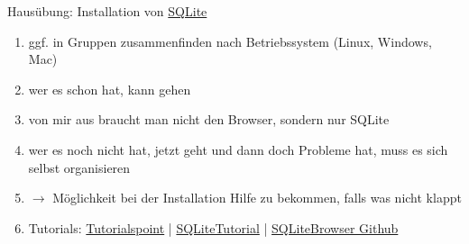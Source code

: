 \begin{frame}[standout]
    \alert{Hausübung:} Installation von \alert{\href{https://sqlitebrowser.org/dl/}{SQLite}} \\[1em]
    {\footnotesize
    \begin{enumerate}
        \item ggf. in Gruppen zusammenfinden nach Betriebssystem (Linux, Windows, Mac)
        \item wer es schon hat, kann gehen
        \item von mir aus braucht man nicht den Browser, sondern nur SQLite 
        \item wer es noch nicht hat, jetzt geht und dann doch Probleme hat, muss es sich selbst organisieren
        \item $\to$ Möglichkeit bei der Installation Hilfe zu bekommen, falls was nicht klappt
        \item \alert{Tutorials: \href{https://www.tutorialspoint.com/sqlite/sqlite_installation.htm}{Tutorialspoint} | \href{https://www.sqlitetutorial.net/download-install-sqlite/}{SQLiteTutorial} | \href{https://github.com/sqlitebrowser/sqlitebrowser}{SQLiteBrowser Github}}
    \end{enumerate}
    }
\end{frame}
